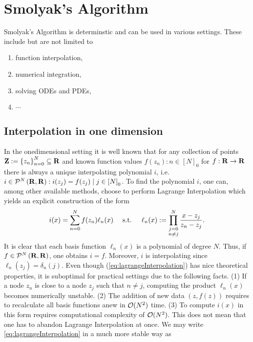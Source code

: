 \documentclass[12pt, oneside]{amsart}
\theoremstyle{definition}
\theoremstyle{remark}
\numberwithin{equation}{section}
\begin{document}
\section{Smolyak's Algorithm}


Smolyak's Algorithm is determinstic and can be used in various settings. These include but are not limited to
\begin{enumerate}
    \item function interpolation,
    \item numerical integration,
    \item solving ODEs and PDEs,
    \item \(\cdots\)
\end{enumerate}
\subsection*{Interpolation in one dimension}
In the onedimensional setting it is well known that for any collection of points \(\ZZ \defn \set{z_n}_{n=0}^N \subseteq \R\) and known function values \(f(z_n): n \in {[N]}_0\) for \(f: \R \to \R\) there is always a unique interpolating polynomial \(i\), i.e. \(i \in \pols[N]{\R, \R}: i(z_j) = f(z_j) \mid j \in {[N]}_0\). To find the polynomial \(i\), one can, among other available methods, choose to perform Lagrange Interpolation which yields an explicit construction of the form
\begin{equation}\label{eq:lagrangeInterpolation}
    i(x) = \sum_{n=0}^N f(z_n) \ell_n(x)\quad \text{ s.t. }\quad \ell_n(x) \defn \prod_{\substack{j = 0\\n \neq j}}^N \frac{x-z_j}{z_n-z_j}.
\end{equation}
It is clear that each basis function \(\ell_n(x)\) is a polynomial of degree \(N\). Thus, if \(f \in \pols[N]{\R, \R}\), one obtains \(i = f\). Moreover, \(i\) is interpolating since \(\ell_n(z_j) = \delta_{n}(j)\). Even though (\ref{eq:lagrangeInterpolation}) has nice theoretical properties, it is suboptimal for practical settings due to the following facts. (1) If a node \(z_n\) is close to a node \(z_j\) such that \(n \neq j\), computing the product \(\ell_n(x)\) becomes numerically unstable. (2) The addition of new data \(\left(z, f(z)\right)\) requires to recalculate all basis functions anew in \(\cO(N^2)\) time. (3) To compute \(i(x)\) in this form requires computational complexity of \(\cO(N^2)\). This does not mean that one has to abandon Lagrange Interpolation at once. We may write \cref{eq:lagrangeInterpolation} in a much more stable way as
\end{document}
